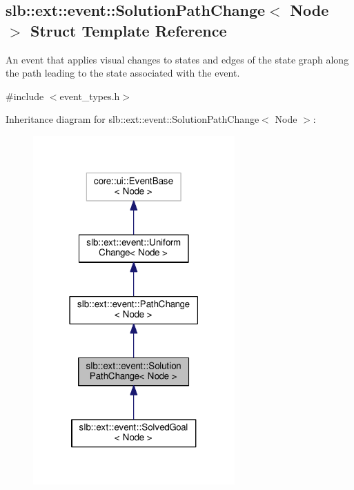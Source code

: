 \hypertarget{structslb_1_1ext_1_1event_1_1SolutionPathChange}{}\subsection{slb\+:\+:ext\+:\+:event\+:\+:Solution\+Path\+Change$<$ Node $>$ Struct Template Reference}
\label{structslb_1_1ext_1_1event_1_1SolutionPathChange}


An event that applies visual changes to states and edges of the state graph along the path leading to the state associated with the event.  




{\ttfamily \#include $<$event\+\_\+types.\+h$>$}



Inheritance diagram for slb\+:\+:ext\+:\+:event\+:\+:Solution\+Path\+Change$<$ Node $>$\+:\nopagebreak
\begin{figure}[H]
\begin{center}
\leavevmode
\includegraphics[width=219pt]{structslb_1_1ext_1_1event_1_1SolutionPathChange__inherit__graph}
\end{center}
\end{figure}


